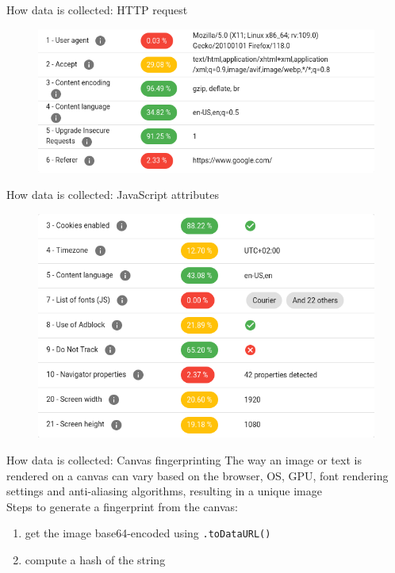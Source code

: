 \begin{frame}{How data is collected: HTTP request}
  \begin{figure}
    \centering
    \includegraphics[width=\textwidth]{images/http-data.png}
  \end{figure}
\end{frame}

\begin{frame}{How data is collected: JavaScript attributes}
  \begin{figure}
    \centering
    \includegraphics[width=\textwidth]{images/js-data.png}
  \end{figure}
\end{frame}

\begin{frame}{How data is collected: Canvas fingerprinting}
  The way an image or text is rendered on a canvas can vary based on the browser, OS, GPU, font rendering settings and anti-aliasing algorithms, resulting in a unique image \\[1cm]
  \noindent Steps to generate a fingerprint from the canvas:
  \vspace{0.5cm}
  \begin{enumerate}
    \item get the image base64-encoded using \texttt{.toDataURL()}
          \vspace{0.5cm}
    \item compute a hash of the string
  \end{enumerate}
\end{frame}


